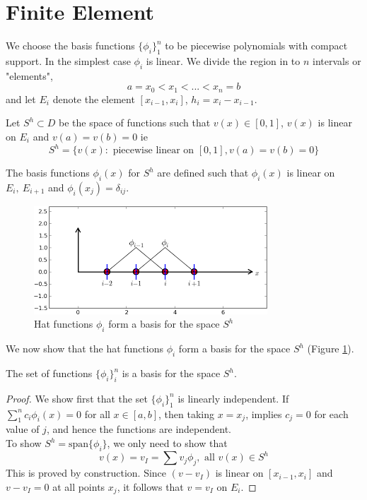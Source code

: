 \section{Finite Element}
We choose the basis functions $\{\phi_i \}_1^n$ to be piecewise polynomials with
compact support.  In the simplest case $\phi_i$ is linear. We divide
 the region in to $n$ intervals or "elements",
\[a=x_0 < x_1 < ... <x_n=b  \]
and let $E_i$ denote the element $[x_{i-1},x_i]$, $h_i=x_i-x_{i-1}$.\\

\begin{definition}
Let $S^h \subset D$ be the space of functions such that $v(x) \in [0,1]$, $v(x)$
is linear on $E_i$ and $v(a)=v(b)=0$ ie
\[S^h = \{v(x): \mbox{ piecewise linear on } [0,1], v(a)=v(b)=0\} \]
\end{definition}
The basis functions $\phi_i(x)$ for $S^h$ are defined such that $\phi_i(x)$ is linear on $E_i, \ E_{i+1}$ and $\phi_i(x_j)=\delta_{ij}$.\\
\begin{figure}[H]
  \caption{Hat functions $\phi_i$ form a basis for the space $S^h$ }\label{hatfun}
  \centering
    \includegraphics{FIGURES/PoissonEqn/hat_function.png}
\end{figure}
We now show that the hat functions $\phi_i$ form a basis for the space $S^h$ (Figure \ref{hatfun}).
\begin{lemma}
The set of functions $\{\phi_i \}_i^n$ is a basis for the space $S^h$.
\end{lemma}
\begin{proof}
We show first that the set $\{\phi_i \}_{1}^n$ is linearly independent.
If
$\sum_{1}^n c_i \phi_i(x) =0$ for all $x \in [a,b]$, then taking $x=x_j$, implies
$c_j=0$ for each value of $j$, and hence the functions are independent.\\
To show $S^h=\mbox{span}\{\phi_i \}$, we only need to show that
\[v(x)=v_{I}=\sum v_j\phi_j, \mbox{ all } v(x) \in S^h \]
This is proved by construction. Since $(v-v_{I})$ is linear on $[
x_{i-1},x_i]$ and $v-v_{I}=0$ at all points $x_j$, it follows that $v=v_I$ on $E_i$.
\end{proof}
